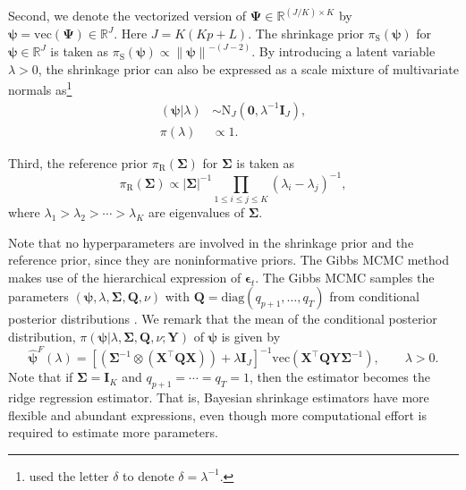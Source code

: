\documentclass[
]{jss}
\begin{document}
Second, we denote the vectorized version of
\(\mathbf{\Psi} \in\mathbb{R}^{(J/K)\times K}\) by
\(\boldsymbol\psi = \text{vec}(\mathbf{\Psi}) \in\mathbb{R}^{J}\). Here
\(J = K (Kp + L)\). The shrinkage prior
\(\pi_\text{S}(\boldsymbol\psi)\) for
\(\boldsymbol\psi \in\mathbb{R}^{J}\) is taken as
\(\pi_\text{S}(\boldsymbol\psi) \propto \left\| \boldsymbol\psi \right\|^{ -(J-2) }.\)
By introducing a latent variable \(\lambda>0\), the shrinkage prior can
also be expressed as a scale mixture of multivariate normals
as\footnote{\cite{Ni05} used the letter $\delta$ to denote $\delta = \lambda^{-1}$.}
\begin{equation}
    \label{psi_normal_const_prior}
    \begin{split}
    (\boldsymbol\psi | \lambda)    & \sim \text{N}_{J} (\mathbf{0}, \lambda^{-1} \mathbf{I}_J),
    \\
    \pi (\lambda)   & \propto 1.
    \end{split}
    \end{equation}

Third, the reference prior \(\pi_\text{R}(\mathbf{\Sigma})\) for
\(\mathbf{\Sigma}\) is taken as \begin{equation}
    \pi_\text{R}(\mathbf{\Sigma}) \propto \left| \mathbf{\Sigma} \right|^{-1} \prod_{1\leq i\leq j\leq K} (\lambda_i - \lambda_j)^{-1},
    \end{equation} where \(\lambda_1 > \lambda_2 > \cdots > \lambda_K\)
are eigenvalues of \(\mathbf{\Sigma}\).

Note that no hyperparameters are involved in the shrinkage prior and the
reference prior, since they are noninformative priors. The Gibbs MCMC
method makes use of the hierarchical expression of
\(\boldsymbol\epsilon_t\). The Gibbs MCMC samples the parameters
\((\boldsymbol\psi, \lambda, \mathbf{\Sigma}, \mathbf{Q}, \nu)\) with
\(\mathbf{Q} = \text{diag}(q_{p+1}, \ldots, q_T)\) from conditional
posterior distributions \citep{Ni05}. We remark that the mean of the
conditional posterior distribution,
\(\pi(\boldsymbol\psi | \lambda, \mathbf{\Sigma}, \mathbf{Q}, \nu; \mathbf{Y})\)
of \(\boldsymbol\psi\) is given by \begin{equation}
    \label{expr_fbayes_psihat}
    \widehat{\boldsymbol\psi}^{F} (\lambda)  = \left[\left(\mathbf{\Sigma}^{-1} \otimes \left( \mathbf{X}^\top \mathbf{Q} \mathbf{X} \right) \right) + \lambda \mathbf{I}_J     \right]^{-1} \text{vec}\left( \mathbf{X}^\top \mathbf{Q} \mathbf{Y} \mathbf{\Sigma}^{-1} \right), 
    \qquad
    \lambda > 0.
    \end{equation} Note that if \(\mathbf{\Sigma} = \mathbf{I}_K\) and
\(q_{p+1}=\cdots=q_T = 1\), then the estimator becomes the ridge
regression estimator. That is, Bayesian shrinkage estimators have more
flexible and abundant expressions, even though more computational effort
is required to estimate more parameters.
\end{document}
